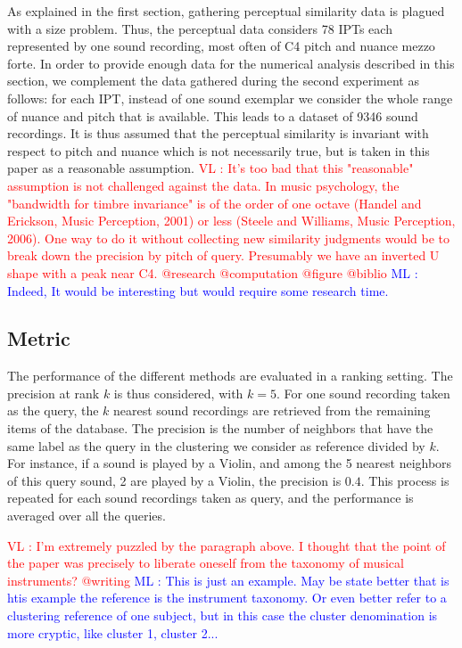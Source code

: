 \documentclass{article}
\newcommand{\ipt}{IPT\xspace}
\newcommand{\ipts}{IPTs\xspace}
\newcommand{\ml}[1]{\textcolor{blue}{ML : #1}}
\newcommand{\vl}[1]{\textcolor{red}{VL : #1}}
\begin{document}
As explained in the first section, gathering perceptual similarity data is plagued with a size problem. Thus, the perceptual data considers 78 \ipts each represented by one sound recording, most often of C4 pitch and nuance mezzo forte. In order to provide enough data for the numerical analysis described in this section, we complement the data gathered during the second experiment as follows: for each \ipt, instead of one sound exemplar we consider the whole range of nuance and pitch that is available. This leads to a dataset of 9346 sound recordings. It is thus assumed that the perceptual similarity is invariant with respect to pitch and nuance which is not necessarily true, but is taken in this paper as a reasonable assumption.
\vl{It's too bad that this "reasonable" assumption is not challenged against the data. In music psychology, the "bandwidth for timbre invariance" is of the order of one octave (Handel and Erickson, Music Perception, 2001) or less (Steele and Williams, Music Perception, 2006).
One way to do it without collecting new similarity judgments would be to break down the precision by pitch of query.
Presumably we have an inverted U shape with a peak near C4.
@research @computation @figure @biblio}
\ml{Indeed, It would be interesting but would require some research time.}

\subsection{Metric}

The performance of the different methods are evaluated in a ranking setting. The precision at rank $k$ is thus considered, with $k=5$. For one sound recording taken as the query, the $k$ nearest sound recordings are retrieved from the remaining items of the database. The precision is the number of neighbors that have the same label as the query in the clustering we consider as reference divided by $k$. For instance, if a sound is played by a Violin, and among the 5 nearest neighbors of this query sound, 2 are played by a Violin, the precision is $0.4$. This process is repeated for each sound recordings taken as query, and the performance is averaged over all the queries.

\vl{I'm extremely puzzled by the paragraph above. I thought that the point of the paper was precisely to liberate oneself from the taxonomy of musical instruments? @writing}
\ml{This is just an example. May be state better that is htis example the reference is the instrument taxonomy. Or even better refer to a clustering reference of one subject, but in this case the cluster denomination is more cryptic, like cluster 1, cluster 2...}
\end{document}
